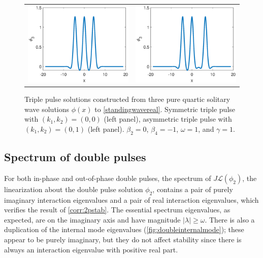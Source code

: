 \documentclass[12pt]{elsarticle}
\def\calL{{\mathcal L}}
\begin{document}
\begin{figure}[H]
\centering
\begin{tabular}{cc}
\includegraphics[width=8cm]{images/triple00} &
\includegraphics[width=8cm]{images/triple01}
\end{tabular}
\caption{Triple pulse solutions constructed from three pure quartic solitary wave solutions $\phi(x)$ to \cref{standingwavereal}. Symmetric triple pulse with $(k_1, k_2) = (0,0)$ (left panel), asymmetric triple pulse with $(k_1, k_2) = (0,1)$ (left panel). $\beta_2 = 0$, $\beta_4 = -1$, $\omega = 1$, and $\gamma = 1$.}
\label{fig:triplepulses}
\end{figure} 

\subsection{Spectrum of double pulses}

For both in-phase and out-of-phase double pulses, the spectrum of $J \calL(\phi_2)$, the linearization about the double pulse solution $\phi_2$, contains a pair of purely imaginary interaction eigenvalues and a pair of real interaction eigenvalues, which verifies the result of \cref{corr:2pstab}. The essential spectrum eigenvalues, as expected, are on the imaginary axis and have magnitude $|\lambda| \geq \omega$. There is also a duplication of the internal mode eigenvalues (\cref{fig:doubleinternalmode}); these appear to be purely imaginary, but they do not affect stability since there is always an interaction eigenvalue with positive real part.
\end{document}
